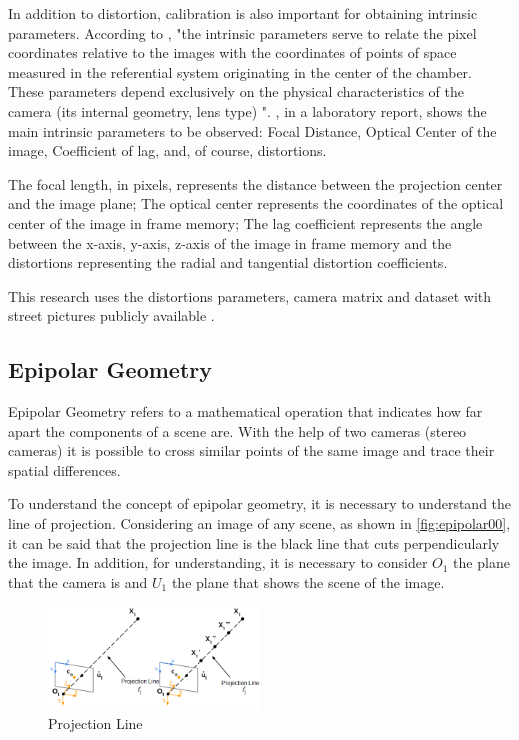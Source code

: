     In addition to distortion, calibration is also important for obtaining intrinsic parameters. According to \cite{cameraCalibration1}, "the intrinsic parameters serve to relate the pixel coordinates relative to the images with the coordinates of points of space measured in the referential system originating in the center of the chamber. These parameters depend exclusively on the physical characteristics of the camera (its internal geometry, lens type) ". \cite{cameraCalibration2}, in a laboratory report, shows the main intrinsic parameters to be observed: Focal Distance, Optical Center of the image, Coefficient of lag, and, of course, distortions.

    The focal length, in pixels, represents the distance between the projection center and the image plane; The optical center represents the coordinates of the optical center of the image in frame memory; The lag coefficient represents the angle between the x-axis, y-axis, z-axis of the image in frame memory and the distortions representing the radial and tangential distortion coefficients.
    
    This research uses the distortions parameters, camera matrix and dataset with street pictures publicly available \cite{Geiger2013IJRR}.

\subsection{Epipolar Geometry}

    Epipolar Geometry refers to a mathematical operation that indicates how far apart the components of a scene are. With the help of two cameras (stereo cameras) it is possible to cross similar points of the same image and trace their spatial differences.

    To understand the concept of epipolar geometry, it is necessary to understand the line of projection. Considering an image of any scene, as shown in \autoref{fig:epipolar00}, it can be said that the projection line is the black line that cuts perpendicularly the image. In addition, for understanding, it is necessary to consider \(O_{1}\) the plane that the camera is and \(U_{1}\) the plane that shows the scene of the image.
    
    \begin{figure}[H]
     \caption{\label{fig:epipolar00}
Projection Line}
     \begin{center}
        \includegraphics[width=0.5\textwidth]{images/epipolar0.png}
     \end{center}
    \end{figure}

